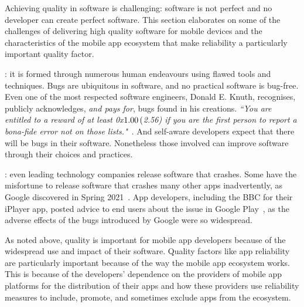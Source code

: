 Achieving quality in software is challenging: software is not perfect and no developer can create perfect software. This section elaborates on some of the challenges of delivering high quality software for mobile devices and the characteristics of the mobile app ecosystem that make reliability a particularly important quality factor.

: it is formed through numerous human endeavours using flawed tools and techniques.
Bugs are ubiquitous in software, and no practical software is bug-free. Even one of the most respected software engineers, Donald E. Knuth, recognises, publicly acknowledges, \emph{and pays for}, bugs found in his creations. %
\emph{``You are entitled to a reward of at least 0x$1.00 \nobreak\hspace{.16667em plus .08333em} ($2.56) if you are the first person to report a \textit{bona-fide} error not on those lists."}~. And self-aware developers expect that there will be bugs in their software. Nonetheless those involved can improve software through their choices and practices.

: even leading technology companies release software that crashes. Some have the misfortune to release software that crashes many other apps inadvertently, as Google discovered in Spring 2021~. App developers, including the BBC for their iPlayer app, posted advice to end users about the issue in Google Play~, as the adverse effects of the bugs introduced by Google were so widespread.

\medskip
As noted above, quality is important for mobile app developers because of the widespread use and impact of their software. Quality factors like app reliability are particularly important because of the way the mobile app ecosystem works. This is because of the developers' dependence on the providers of mobile app platforms for the distribution of their apps and how these providers use reliability measures to include, promote, and sometimes exclude apps from the ecosystem.

